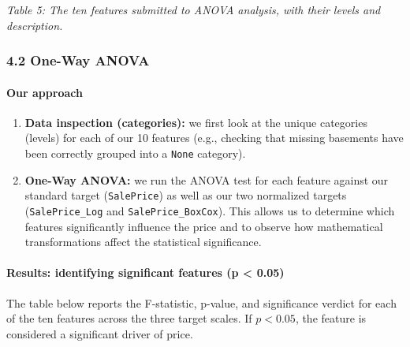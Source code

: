 \emph{Table 5: The ten features submitted to ANOVA analysis, with their
levels and description.}

\subsubsection{4.2 One-Way ANOVA}\label{one-way-anova}

\paragraph{Our approach}\label{our-approach}

\begin{enumerate}
\def\labelenumi{\arabic{enumi}.}
\tightlist
\item
  \textbf{Data inspection (categories):} we first look at the unique
  categories (levels) for each of our 10 features (e.g., checking that
  missing basements have been correctly grouped into a \texttt{None}
  category).
\item
  \textbf{One-Way ANOVA:} we run the ANOVA test for each feature against
  our standard target (\texttt{SalePrice}) as well as our two normalized
  targets (\texttt{SalePrice\_Log} and \texttt{SalePrice\_BoxCox}). This
  allows us to determine which features significantly influence the
  price and to observe how mathematical transformations affect the
  statistical significance.
\end{enumerate}

\paragraph{Results: identifying significant features (p \textless{}
0.05)}\label{results-identifying-significant-features-p-0.05}

The table below reports the F-statistic, p-value, and significance
verdict for each of the ten features across the three target scales. If
\(p < 0.05\), the feature is considered a significant driver of price.

